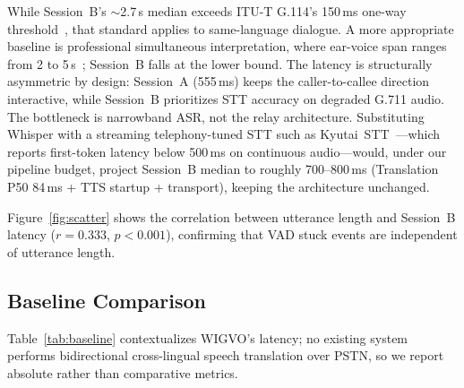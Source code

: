 \documentclass[11pt]{article}
\begin{document}
While Session~B's ${\sim}$2.7\,s median exceeds ITU-T G.114's 150\,ms one-way threshold~\citep{itu_g114_2003}, that standard applies to same-language dialogue. A more appropriate baseline is professional simultaneous interpretation, where ear-voice span ranges from 2 to 5\,s~\citep{goldman_eisler_1972,timarova_2011_evs}; Session~B falls at the lower bound. The latency is structurally asymmetric by design: Session~A (555\,ms) keeps the caller-to-callee direction interactive, while Session~B prioritizes STT accuracy on degraded G.711 audio. The bottleneck is narrowband ASR, not the relay architecture. Substituting Whisper with a streaming telephony-tuned STT such as Kyutai~STT~\citep{kyutai2025stt}---which reports first-token latency below 500\,ms on continuous audio---would, under our pipeline budget, project Session~B median to roughly 700--800\,ms (Translation P50 84\,ms + TTS startup + transport), keeping the architecture unchanged.

Figure~\ref{fig:scatter} shows the correlation between utterance length and Session~B latency ($r=0.333$, $p < 0.001$), confirming that VAD stuck events are independent of utterance length.

\subsection{Baseline Comparison}

Table~\ref{tab:baseline} contextualizes WIGVO's latency; no existing system performs bidirectional cross-lingual speech translation over PSTN, so we report absolute rather than comparative metrics.
\end{document}
